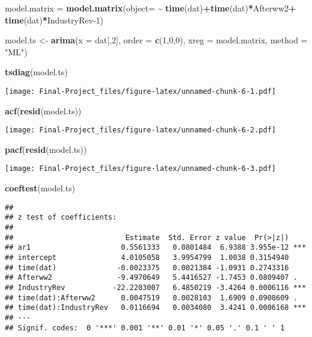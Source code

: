 \documentclass[
]{article}
\newenvironment{Shaded}{\begin{snugshade}}{\end{snugshade}}
\newcommand{\AttributeTok}[1]{\textcolor[rgb]{0.13,0.29,0.53}{#1}}
\newcommand{\DecValTok}[1]{\textcolor[rgb]{0.00,0.00,0.81}{#1}}
\newcommand{\FunctionTok}[1]{\textcolor[rgb]{0.13,0.29,0.53}{\textbf{#1}}}
\newcommand{\NormalTok}[1]{#1}
\newcommand{\OtherTok}[1]{\textcolor[rgb]{0.56,0.35,0.01}{#1}}
\newcommand{\SpecialCharTok}[1]{\textcolor[rgb]{0.81,0.36,0.00}{\textbf{#1}}}
\newcommand{\StringTok}[1]{\textcolor[rgb]{0.31,0.60,0.02}{#1}}
\begin{document}
\begin{Shaded}
\begin{Highlighting}[]
\NormalTok{model.matrix }\OtherTok{=} \FunctionTok{model.matrix}\NormalTok{(}\AttributeTok{object=} \SpecialCharTok{\textasciitilde{}} \FunctionTok{time}\NormalTok{(dat)}\SpecialCharTok{+}\FunctionTok{time}\NormalTok{(dat)}\SpecialCharTok{*}\NormalTok{Afterww2}\SpecialCharTok{+} \FunctionTok{time}\NormalTok{(dat)}\SpecialCharTok{*}\NormalTok{IndustryRev}\DecValTok{{-}1}\NormalTok{)}

\NormalTok{model.ts }\OtherTok{\textless{}{-}} \FunctionTok{arima}\NormalTok{(}\AttributeTok{x =}\NormalTok{ dat[,}\DecValTok{2}\NormalTok{], }\AttributeTok{order =} \FunctionTok{c}\NormalTok{(}\DecValTok{1}\NormalTok{,}\DecValTok{0}\NormalTok{,}\DecValTok{0}\NormalTok{),  }\AttributeTok{xreg =}\NormalTok{ model.matrix, }\AttributeTok{method =} \StringTok{"ML"}\NormalTok{)}

\FunctionTok{tsdiag}\NormalTok{(model.ts)}
\end{Highlighting}
\end{Shaded}

\texttt{[image: Final-Project\_files/figure-latex/unnamed-chunk-6-1.pdf]}

\begin{Shaded}
\begin{Highlighting}[]
\FunctionTok{acf}\NormalTok{(}\FunctionTok{resid}\NormalTok{(model.ts))}
\end{Highlighting}
\end{Shaded}

\texttt{[image: Final-Project\_files/figure-latex/unnamed-chunk-6-2.pdf]}

\begin{Shaded}
\begin{Highlighting}[]
\FunctionTok{pacf}\NormalTok{(}\FunctionTok{resid}\NormalTok{(model.ts))}
\end{Highlighting}
\end{Shaded}

\texttt{[image: Final-Project\_files/figure-latex/unnamed-chunk-6-3.pdf]}

\begin{Shaded}
\begin{Highlighting}[]
\FunctionTok{coeftest}\NormalTok{(model.ts)}
\end{Highlighting}
\end{Shaded}

\begin{verbatim}
## 
## z test of coefficients:
## 
##                          Estimate  Std. Error z value  Pr(>|z|)    
## ar1                     0.5561333   0.0801484  6.9388 3.955e-12 ***
## intercept               4.0105058   3.9954799  1.0038 0.3154940    
## time(dat)              -0.0023375   0.0021384 -1.0931 0.2743316    
## Afterww2               -9.4970649   5.4416527 -1.7453 0.0809407 .  
## IndustryRev           -22.2203007   6.4850219 -3.4264 0.0006116 ***
## time(dat):Afterww2      0.0047519   0.0028103  1.6909 0.0908609 .  
## time(dat):IndustryRev   0.0116694   0.0034080  3.4241 0.0006168 ***
## ---
## Signif. codes:  0 '***' 0.001 '**' 0.01 '*' 0.05 '.' 0.1 ' ' 1
\end{verbatim}
\end{document}
